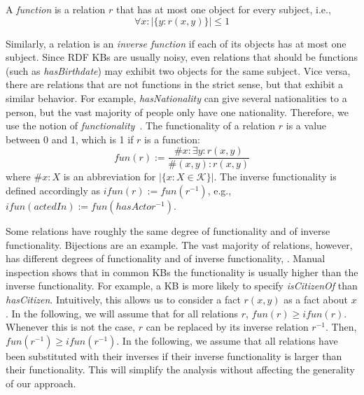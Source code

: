 
A \emph{function} is a relation $r$ that has at most one object for every subject, i.e.,
\[
 \forall x: |\{y: r(x,y)\}| \leq 1
\]

Similarly, a relation is an \emph{inverse function} if each of its objects has at most one subject. 
Since RDF KBs are usually noisy, even relations that should be functions (such as \emph{has\-Birthdate}) may exhibit two objects for the same subject.
Vice versa, there are relations that are not functions in the strict sense, but that exhibit a similar behavior.
For example, \emph{has\-Nationality} can give several nationalities to a person, but the vast majority of people only have one nationality.
Therefore, we use the notion of \emph{functionality}~\cite{paris}. The functionality of a relation $r$ is a value between 0 and 1, which is 1 if $r$ is a function:
\[fun(r) := \frac{\#x: \exists y: r(x,y)}{\#(x,y): r(x,y)}\]
where  $\#x:X$ is an abbreviation for $|\{x: X \in \mathcal{K}\}|$.
The inverse functionality is defined accordingly as $ifun(r):=fun(r^{-1})$, e.g., $ifun(actedIn):=fun(hasActor^{-1})$.


Some relations have roughly the same degree of functionality and of inverse functionality. Bijections are an example.
The vast majority of relations, however, has different degrees of functionality and of inverse functionality, .
Manual inspection shows that in common KBs the functionality is usually higher than the inverse functionality.
For example, a KB is more likely to specify \emph{isCitizenOf} than \emph{has\-Citizen}.
Intuitively, this allows us to consider a fact $r(x,y)$ as a fact about $x$.
In the following, we will assume that for all relations $r$, $fun(r)\geq ifun(r)$.
Whenever this is not the case, $r$ can be replaced by its inverse relation $r^{-1}$. Then, $fun(r^{-1})\geq ifun(r^{-1})$.
In the following, we assume that all relations have been substituted with their inverses if their inverse functionality is larger than their functionality.
This will simplify the analysis without affecting the generality of our approach.



